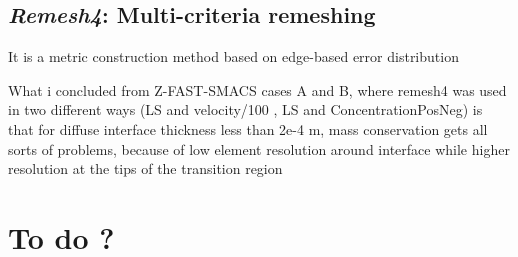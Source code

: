 \subsection{\emph{Remesh4}: Multi-criteria remeshing}
It is a metric construction method based on edge-based error distribution

What i concluded from Z-FAST-SMACS cases A and B, where remesh4 was used in two different ways (LS and velocity/100  ,  LS and ConcentrationPosNeg)
is that for diffuse interface thickness less than 2e-4 m, mass conservation gets all sorts of problems, because of low element resolution 
around interface while higher resolution at the tips of the transition region


\section*{To do ?}



